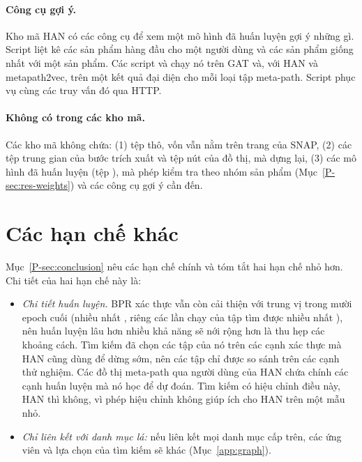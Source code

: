 \paragraph{Công cụ gợi ý.} Kho mã HAN có các công cụ để xem một mô hình đã huấn luyện gợi ý những
gì. Script  liệt kê các sản phẩm hàng đầu cho một người dùng và các sản phẩm
giống nhất với một sản phẩm. Các script  và 
chạy nó trên GAT và, với HAN và metapath2vec, trên một kết quả đại diện cho mỗi loại tập meta-path.
Script  phục vụ cùng các truy vấn đó qua HTTP.

\paragraph{Không có trong các kho mã.} Các kho mã không chứa: (1) tệp thô, vốn vẫn nằm trên
trang của SNAP, (2) các tệp trung gian của bước trích xuất và tệp nút của đồ thị, mà
 dựng lại, (3) các mô hình đã huấn luyện (tệp ), mà phép kiểm tra theo nhóm sản phẩm (Mục~\ref*{P-sec:res-weights}) và các
công cụ gợi ý cần đến.

\section{Các hạn chế khác}
\label{app:limits}

Mục~\ref*{P-sec:conclusion} nêu các hạn chế chính và tóm tắt hai hạn chế nhỏ hơn. Chi tiết của hai
hạn chế này là:
\begin{itemize}
  \item \emph{Chi tiết huấn luyện.} BPR xác thực vẫn còn cải thiện với trung vị 
        trong mười epoch cuối (nhiều nhất , riêng các lần chạy của tập tìm được
        nhiều nhất ), nên huấn luyện lâu hơn nhiều khả năng sẽ nới rộng hơn
        là thu hẹp các khoảng cách. Tìm kiếm đã chọn các tập của nó trên các cạnh xác thực mà HAN
        cũng dùng để dừng sớm, nên các tập chỉ được so sánh trên các cạnh thử nghiệm. Các đồ thị
        meta-path qua người dùng của HAN chứa chính các cạnh huấn luyện mà nó học để dự đoán. Tìm
        kiếm có hiệu chỉnh điều này, HAN thì không, vì phép hiệu chỉnh không giúp ích cho HAN trên
        một mẫu nhỏ.
  \item \emph{Chỉ liên kết với danh mục lá:} nếu liên kết mọi danh mục cấp trên, các ứng viên và
        lựa chọn của tìm kiếm sẽ khác (Mục~\ref{app:graph}).
\end{itemize}
